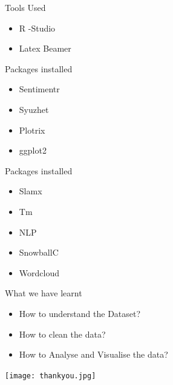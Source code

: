 \documentclass[14pt]{beamer}
\begin{document}
\begin{frame}{Tools Used}
  \begin{itemize}
     \item R -Studio
     \item Latex Beamer
     \end{itemize}
\end{frame}
\begin{frame}{Packages installed}
     \begin{itemize}
         \item  Sentimentr
         \item  Syuzhet
         \item  Plotrix
         \item  ggplot2
     \end {itemize}
\end{frame}
\begin{frame}{Packages installed}
       \begin{itemize}
          \item Slamx
         \item  Tm
         \item  NLP
         \item  SnowballC
         \item  Wordcloud
         \end{itemize}
\end{frame}
\begin{frame}{What we have learnt}
       \begin{itemize}
           \item How to understand the Dataset?
           \item How to clean the data?
           \item How to Analyse  and Visualise the data?
       \end{itemize}
\end{frame}
\begin{frame}
      \texttt{[image: thankyou.jpg]}
\end{frame}
\end{document}

